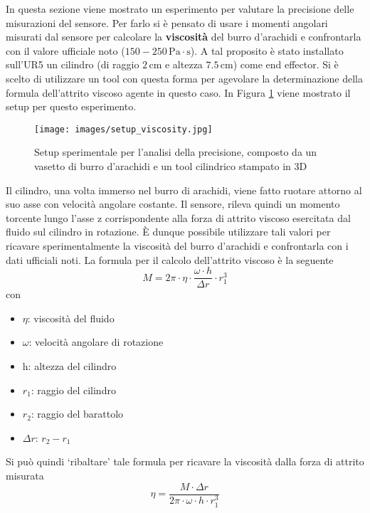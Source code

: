 In questa sezione viene mostrato un esperimento per valutare la precisione delle misurazioni del sensore\footnotemark{}. 
Per farlo si \`{e} pensato di usare i momenti angolari misurati dal sensore per calcolare la \textbf{viscosit\`{a}} del burro 
d'arachidi e confrontarla con il valore ufficiale noto ($150-250 \, \text{Pa} \cdot \text{s}$). 
A tal proposito \`{e} stato installato sull'UR5 un cilindro (di raggio $2 \, \text{cm}$ e altezza $7.5 \, \text{cm}$) come end effector. 
Si \`{e} scelto di utilizzare un tool con questa forma per agevolare la determinazione della formula dell'attrito viscoso agente 
in questo caso.
In Figura \ref{fig:peanut_butter} viene mostrato il setup per questo esperimento. 
\begin{figure}[H]
    \centering
    \texttt{[image: images/setup\_viscosity.jpg]}
    \caption{Setup sperimentale per l'analisi della precisione, composto da un vasetto di burro d'arachidi e un tool 
    cilindrico stampato in 3D}
    \label{fig:peanut_butter}
\end{figure}
Il cilindro, una volta immerso nel burro di arachidi, viene fatto ruotare attorno al suo asse con velocit\`{a} angolare 
costante. Il sensore, rileva quindi un momento torcente lungo l'asse z corrispondente alla forza di attrito viscoso esercitata 
dal fluido sul cilindro in rotazione. \`{E} dunque possibile utilizzare tali valori per ricavare sperimentalmente 
la viscosit\`{a} del burro d'arachidi e confrontarla con i dati ufficiali noti. 
La formula per il calcolo dell'attrito viscoso \`{e} la seguente 
\begin{equation*}
    M = 2\pi \cdot \eta \cdot \frac{\omega \cdot h}{\Delta r} \cdot r_{1}^{3}
\end{equation*}
con 
\begin{itemize}
    \item $\eta$: viscosit\`{a} del fluido
    \item $\omega$: velocit\`{a} angolare di rotazione
    \item h: altezza del cilindro
    \item $r_{1}$: raggio del cilindro
    \item $r_{2}$: raggio del barattolo
    \item $\Delta r$: $r_{2} - r_{1}$
\end{itemize}
Si pu\`{o} quindi `ribaltare' tale formula per ricavare la viscosit\`{a} dalla forza di attrito misurata 
\begin{equation} \label{eq:eta}
    \eta = \frac{M \cdot \Delta r}{2\pi \cdot \omega \cdot h \cdot r_{1}^{3}}
\end{equation}
